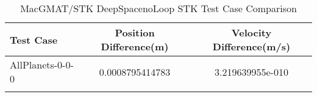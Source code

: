 \begin{table}[htbp!]
\centering
\caption{ MacGMAT/STK DeepSpacenoLoop STK Test Case Comparison}
      \begin{tabular}{lcc}
      \hline\hline
          Test Case & Position Difference(m) & Velocity Difference(m/s) \\
         \hline
         AllPlanets-0-0-0 & 0.0008795414783 & 3.219639955e-010 \\
      \hline\hline
      \label{Table: DeepSpacenoLoop STK Table} 
\end{tabular}
\end{table}
